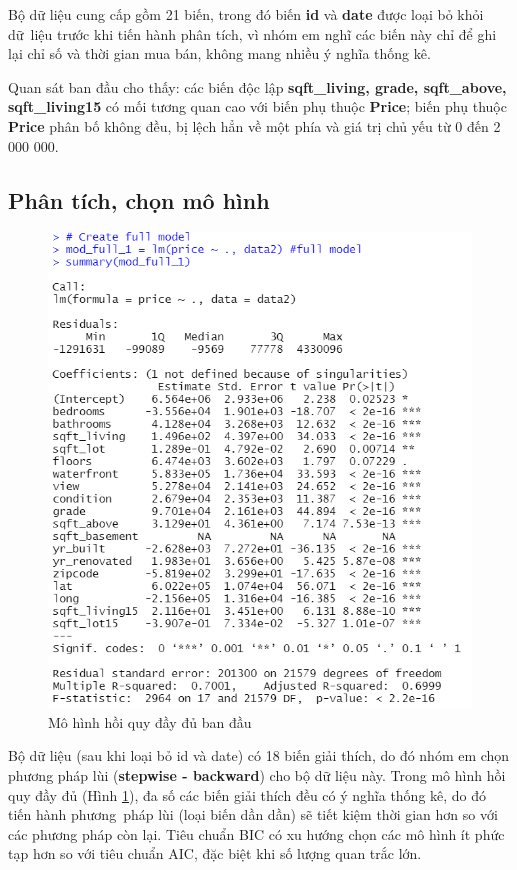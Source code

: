 Bộ dữ liệu cung cấp gồm 21 biến, trong đó biến \textbf{id} và \textbf{date} được loại bỏ khỏi dữ~liệu trước khi tiến hành phân tích, vì nhóm em nghĩ các biến này chỉ để ghi lại chỉ số và thời gian mua bán, không mang nhiều ý nghĩa thống kê. 

Quan sát ban đầu cho thấy: các biến độc lập \textbf{sqft\_living, grade, sqft\_above, sqft\_living15} có mối tương quan cao với biến phụ thuộc \textbf{Price}; biến phụ thuộc \textbf{Price} phân bố không đều, bị lệch hẳn về một phía và giá trị chủ yếu từ 0 đến 2 000 000.
\subsection*{Phân tích, chọn mô hình}

\begin{figure}[h!]
	\centering
	\includegraphics[width=0.6\linewidth]{../Photo Of Result/B2_originalmodel_R}
	\caption{Mô hình hồi quy đầy đủ ban đầu}
	\label{B2_full}
\end{figure}

Bộ dữ liệu (sau khi loại bỏ id và date) có 18 biến giải thích, do đó nhóm em chọn phương pháp lùi (\textbf{stepwise - backward}) cho bộ dữ liệu này. Trong mô hình hồi quy đầy đủ (Hình \ref{B2_full}), đa số các biến giải thích đều có ý nghĩa thống kê, do đó tiến hành phương~pháp lùi (loại biến dần dần) sẽ tiết kiệm thời gian hơn so với các phương pháp còn lại.  Tiêu chuẩn BIC có xu hướng chọn các mô hình ít phức tạp hơn so với tiêu chuẩn AIC, đặc biệt khi số lượng quan trắc lớn.

